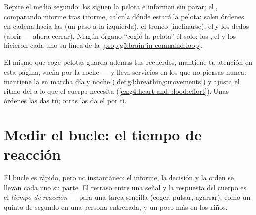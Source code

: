 \begin{example}\label{ex:g5:brain-in-command:catch}
Repite el medio segundo: los  siguen la pelota e informan sin
parar; el , comparando informe tras informe, calcula dónde
estará la pelota; salen órdenes en cadena hacia las  (un paso a
la izquierda), el tronco (inclinarse), el  y los dedos (abrir ---
ahora cerrar). Ningún órgano ``cogió la pelota'' él solo: los , el
 y los  hicieron cada uno su línea de la
\cref{prop:g5:brain-in-command:loop}.
\end{example}

\begin{remark}\label{rem:g5:brain-in-command:more}
El mismo  que coge pelotas guarda además tus recuerdos,
mantiene tu atención en esta página, sueña por la noche --- y lleva
servicios en los que no piensas nunca: mantiene la  en
marcha día y noche (\cref{def:g4:breathing:movements}) y ajusta el
ritmo del  a lo que el cuerpo necesita
(\cref{ex:g4:heart-and-blood:effort}). Unas órdenes las das tú; otras
las da el  por ti.
\end{remark}

\section{Medir el bucle: el tiempo de reacción}

\begin{definition}\label{def:g5:brain-in-command:reaction}
El bucle es rápido, pero no instantáneo: el informe, la decisión y la
orden se llevan cada uno su parte. El retraso entre una señal y la
respuesta del cuerpo es el \emph{tiempo de reacción}
--- para una tarea sencilla (coger, pulsar, agarrar), como
un quinto de segundo en una persona entrenada, y un poco más en los
niños.
\end{definition}

